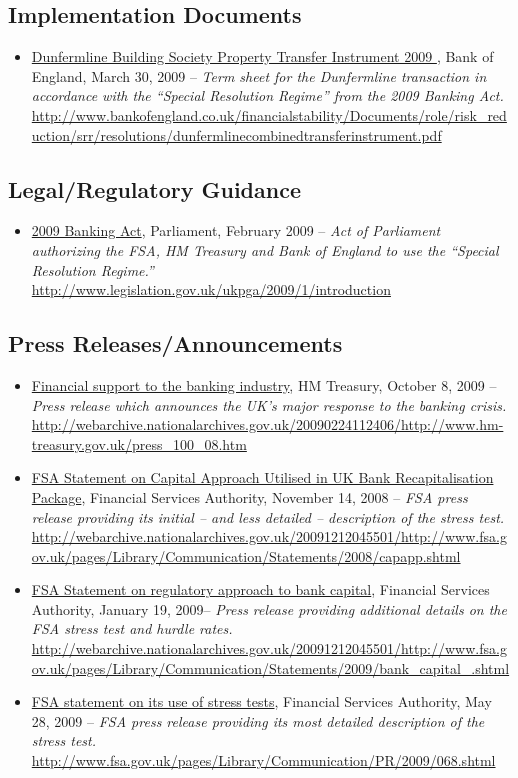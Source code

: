 \documentclass[12pt]{article}
\begin{document}
\subsection{Implementation Documents}
\begin{itemize}
\item
\ul{Dunfermline Building Society Property Transfer Instrument 2009 }, Bank of England, March 30, 2009 -- \emph{Term sheet for the Dunfermline transaction in accordance with the ``Special Resolution Regime'' from the 2009 Banking Act.} \url{http://www.bankofengland.co.uk/financialstability/Documents/role/risk_reduction/srr/resolutions/dunfermlinecombinedtransferinstrument.pdf}
\end{itemize}

\subsection{Legal/Regulatory Guidance}

\begin{itemize}
\item
\ul{2009 Banking Act}, Parliament, February 2009 -- \emph{Act of Parliament authorizing the FSA, HM Treasury and Bank of England to use the ``Special Resolution Regime.''} \url{http://www.legislation.gov.uk/ukpga/2009/1/introduction}
\end{itemize}

\subsection{Press Releases/Announcements}

\begin{itemize}
\item
\ul{Financial support to the banking industry}, HM Treasury, October 8, 2009 -- \emph{Press release which
 announces the UK's major response to the banking crisis.} \url{http://webarchive.nationalarchives.gov.uk/20090224112406/http://www.hm-treasury.gov.uk/press_100_08.htm}
\item
\ul{FSA Statement on Capital Approach Utilised in UK Bank Recapitalisation Package}, Financial Services Authority, November 14, 2008 -- \emph{FSA press release providing its initial -- and less detailed -- description of the stress test.} \url{http://webarchive.nationalarchives.gov.uk/20091212045501/http://www.fsa.gov.uk/pages/Library/Communication/Statements/2008/capapp.shtml}
\item
\ul{FSA Statement on regulatory approach to bank capital}, Financial Services Authority, January 19, 2009-- \emph{Press release
 providing additional details on the FSA stress test and hurdle rates.} \url{http://webarchive.nationalarchives.gov.uk/20091212045501/http://www.fsa.gov.uk/pages/Library/Communication/Statements/2009/bank_capital_.shtml}
\item
\ul{FSA statement on its use of stress tests}, Financial Services Authority, May 28, 2009 -- \emph{FSA press release providing its most detailed description of the stress test.} \url{http://www.fsa.gov.uk/pages/Library/Communication/PR/2009/068.shtml}
\end{itemize}
\end{document}
